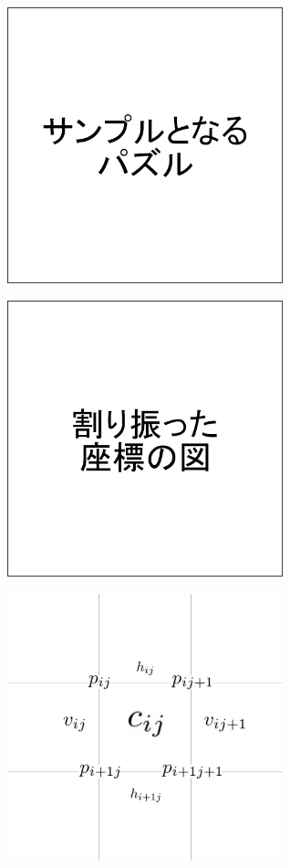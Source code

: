 \begin{clearpagefigure}
  \includegraphics[width=8cm,clip]{fig/samplePuzzle.png}
  \caption{}
  \label{fig:SamplePuzzle}
\end{clearpagefigure}

\begin{clearpagefigure}
  \includegraphics[width=8cm,clip]{fig/coordinate.png}
  \caption{}
  \label{fig:Coordinate}
\end{clearpagefigure}

\begin{clearpagefigure}
  \includegraphics[width=8cm,clip]{fig/define.png}
  \caption{}
  \label{fig:VariableAtBoard}
\end{clearpagefigure}

